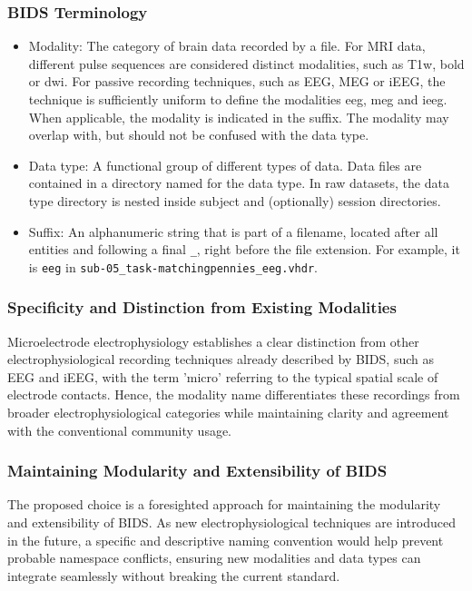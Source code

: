 \documentclass[fleqn,10pt]{wlscirep}
\begin{document}
\subsubsection*{BIDS Terminology}
\begin{itemize}
    \item Modality: The category of brain data recorded by a file. For MRI data, different pulse sequences are considered distinct modalities, such as T1w, bold or dwi. For passive recording techniques, such as EEG, MEG or iEEG, the technique is sufficiently uniform to define the modalities eeg, meg and ieeg. When applicable, the modality is indicated in the suffix. The modality may overlap with, but should not be confused with the data type.
    \item Data type: A functional group of different types of data. Data files are contained in a directory named for the data type. In raw datasets, the data type directory is nested inside subject and (optionally) session directories.
    \item Suffix: An alphanumeric string that is part of a filename, located after all entities and following a final \texttt{\_}, right before the file extension. For example, it is \texttt{eeg} in \texttt{sub-05\_task-matchingpennies\_eeg.vhdr}.
\end{itemize}

\subsubsection*{Specificity and Distinction from Existing Modalities}
Microelectrode electrophysiology establishes a clear distinction from other electrophysiological recording techniques already described by BIDS, such as EEG and iEEG, with the term 'micro' referring to the typical spatial scale of electrode contacts. Hence, the modality name differentiates these recordings from broader electrophysiological categories while maintaining clarity and agreement with the conventional community usage.


\subsubsection*{Maintaining Modularity and Extensibility of BIDS}
The proposed choice is a foresighted approach for maintaining the modularity and extensibility of BIDS. As new electrophysiological techniques are introduced in the future, a specific and descriptive naming convention would help prevent probable namespace conflicts, ensuring new modalities and data types can integrate seamlessly without breaking the current standard.
\end{document}
